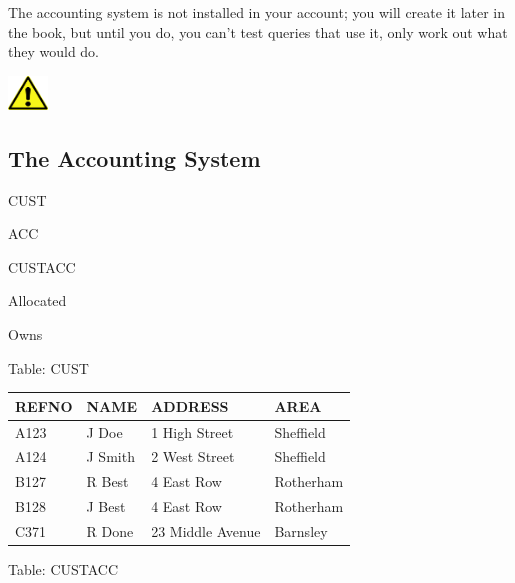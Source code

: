 The accounting system is not installed in your account; you will create it later in the book, but until you do, you can't test queries that use it, only work out what they would do.

\begin{center}
\includegraphics[width=1.06cm,height=0.903cm]{images/img (2).png}

\end{center}
\subsection{The Accounting System}

\begin{center}
\begin{minipage}{3.694cm}
CUST
\end{minipage}
\end{center}
\begin{center}
\begin{minipage}{3.694cm}
ACC
\end{minipage}
\end{center}
\begin{center}
\begin{minipage}{3.81cm}
CUSTACC
\end{minipage}
\end{center}
\begin{minipage}{2.515cm}
Allocated
\end{minipage}
\begin{center}
\begin{minipage}{1.997cm}
Owns
\end{minipage}
\end{center}

Table:  CUST

\begin{flushleft}
\tablefirsthead{}
\tablehead{}
\tabletail{}
\tablelasttail{}
\begin{supertabular}{|m{2.2389998cm}|m{2.55cm}|m{4.053cm}|m{2.799cm}|}
\hline
REFNO &
NAME &
ADDRESS &
AREA\\\hline
A123 &
J Doe &
1 High Street &
Sheffield\\
A124 &
J Smith &
2 West Street &
Sheffield\\
B127 &
R Best &
4 East Row &
Rotherham\\
B128 &
J Best &
4 East Row &
Rotherham\\
C371 &
R Done &
23 Middle Avenue &
Barnsley\\\hline
\end{supertabular}
\end{flushleft}
Table:  CUSTACC

